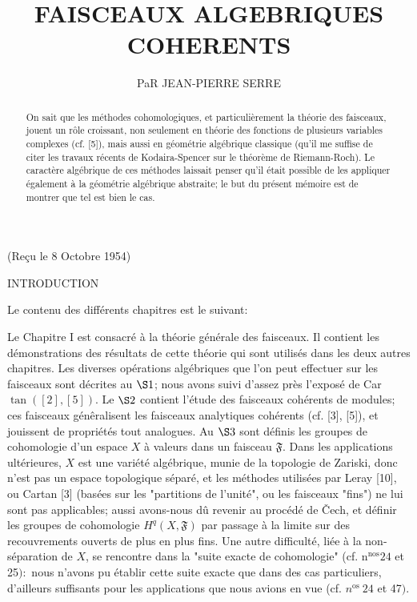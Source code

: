 \title{
    FAISCEAUX ALGEBRIQUES COHERENTS
}

\author{
    PaR JEAN-PIERRE SERRE
}

(Reçu le 8 Octobre 1954)

INTRODUCTION

\begin{abstract}
    On sait que les méthodes cohomologiques, et particulièrement la théorie des faisceaux, jouent un rôle croissant, non seulement en théorie des fonctions de plusieurs variables complexes (cf. [5]), mais aussi en géométrie algébrique classique (qu'il me suffise de citer les travaux récents de Kodaira-Spencer sur le théorème de Riemann-Roch). Le caractère algébrique de ces méthodes laissait penser qu'il était possible de les appliquer également à la géométrie algébrique abstraite; le but du présent mémoire est de montrer que tel est bien le cas.
\end{abstract}

Le contenu des différents chapitres est le suivant:

Le Chapitre I est consacré à la théorie générale des faisceaux. Il contient les démonstrations des résultats de cette théorie qui sont utilisés dans les deux autres chapitres. Les diverses opérations algébriques que l'on peut effectuer sur les faisceaux sont décrites au $\S 1$; nous avons suivi d'assez près l'exposé de Car$\tan ([2],[5]) .$ Le $\S 2$ contient l'étude des faisceaux cohérents de modules; ces faisceaux génêralisent les faisceaux analytiques cohérents (cf. [3], [5]), et jouissent de propriétés tout analogues. Au $\S 3$ sont définis les groupes de cohomologie d'un espace $X$ à valeurs dans un faisceau $\mathfrak{F} .$ Dans les applications ultérieures, $X$ est une variété algébrique, munie de la topologie de Zariski, donc n'est pas un espace topologique séparé, et les méthodes utilisées par Leray [10], ou Cartan [3] (basées sur les "partitions de l'unité", ou les faisceaux "fins") ne lui sont pas applicables; aussi avons-nous dû revenir au procédé de Čech, et définir les groupes de cohomologie $H^{q}(X, \mathfrak{F})$ par passage à la limite sur des recouvrements ouverts de plus en plus fins. Une autre difficulté, liée à la non-séparation de $X$, se rencontre dans la "suite exacte de cohomologie" (cf. $\mathrm{n}^{\mathrm{nos}} 24$ et 25$):$ nous n'avons pu établir cette suite exacte que dans des cas particuliers, d'ailleurs suffisants pour les applications que nous avions en vue (cf. $n^{\text {os }} 24$ et 47$)$.

